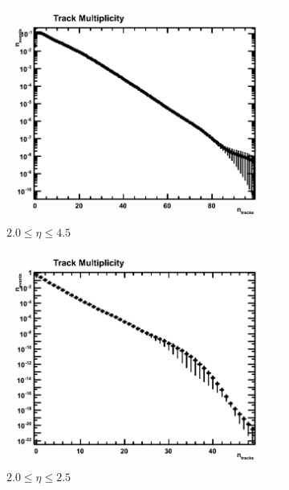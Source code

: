 \begin{figure}[H]
	\centering
	\begin{subfigure}{0.32\textwidth}
		\includegraphics[width=\textwidth]{Chapters/multiplicity/images/background_corrected/real/2-0_4-5_norm.png}
		\caption{$2.0 \le \eta \le 4.5$}
	\end{subfigure}
	\begin{subfigure}{0.32\textwidth}
		\includegraphics[width=\textwidth]{Chapters/multiplicity/images/background_corrected/real/2-0_2-5_norm.png}
		\caption{$2.0 \le \eta \le 2.5$}
	\end{subfigure}
	\begin{subfigure}{0.32\textwidth}

\end{subfigure}
\end{figure}
